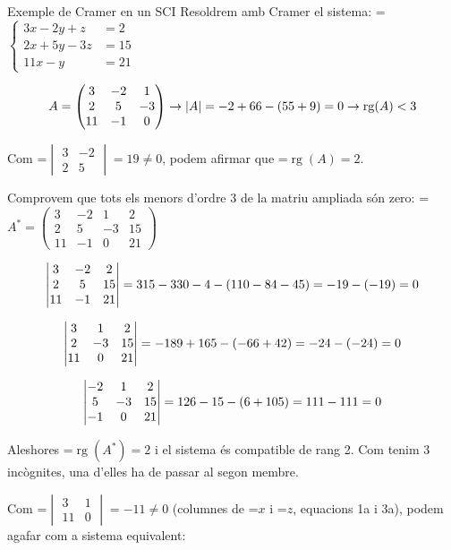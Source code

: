 \documentclass[11pt,a4paper]{article}
\newcommand{\fmm}[1]{\setbox0=\hbox{$#1$}\ifdim\wd0>\linewidth\fmdisp{#1}\else\mbox{\box0}\fi}
\newcommand{\fmdisp}[1]{\[\setbox2=\hbox{$\displaystyle #1$}\ifdim\wd2>\linewidth\resizebox{\linewidth}{!}{\box2}\else\box2\fi\]}
\begin{document}
\begin{fmex}{Exemple de Cramer en un SCI}
Resoldrem amb Cramer el sistema: \fmm{\left\{\begin{aligned}3x-2y+z&=2\\ 2x+5y-3z&=15\\ 11x-y&=21\end{aligned}\right.}

\fmdisp{A=\begin{pmatrix}3 & -2 & 1\\ 2 & 5 & -3\\ 11 & -1 & 0\end{pmatrix}\rightarrow|A|=-2+66-(55+9)=0\rightarrow\operatorname{rg}(A)<3}

Com \fmm{\begin{vmatrix}3 & -2\\ 2 & 5\end{vmatrix}=19\neq0}, podem afirmar que \fmm{\operatorname{rg}(A)=2}.

Comprovem que tots els menors d'ordre 3 de la matriu ampliada són zero: \fmm{A^*=\left(\begin{array}{rrr|r}3 & -2 & 1 & 2\\ 2 & 5 & -3 & 15\\ 11 & -1 & 0 & 21\end{array}\right)}

\fmdisp{\begin{vmatrix}3 & -2 & 2\\ 2 & 5 & 15\\ 11 & -1 & 21\end{vmatrix}=315-330-4-(110-84-45)=-19-(-19)=0}

\fmdisp{\begin{vmatrix}3 & 1 & 2\\ 2 & -3 & 15\\ 11 & 0 & 21\end{vmatrix}=-189+165-(-66+42)=-24-(-24)=0}

\fmdisp{\begin{vmatrix}-2 & 1 & 2\\ 5 & -3 & 15\\ -1 & 0 & 21\end{vmatrix}=126-15-(6+105)=111-111=0}

Aleshores \fmm{\operatorname{rg}(A^*)=2} i el sistema és compatible de rang 2. Com tenim 3 incògnites, una d'elles ha de passar al segon membre.

Com \fmm{\begin{vmatrix}3 & 1\\ 11 & 0\end{vmatrix}=-11\neq0} (columnes de \fmm{x} i \fmm{z}, equacions 1a i 3a), podem agafar com a sistema equivalent:


\end{fmex}
\end{document}
